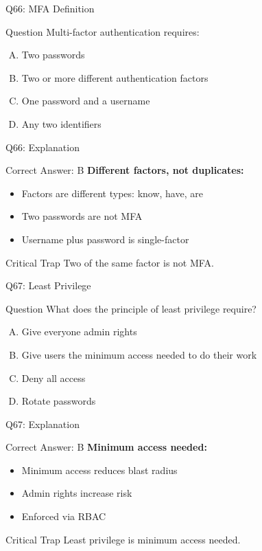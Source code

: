 \documentclass{beamer}
\begin{document}
	\begin{frame}{Q66: MFA Definition}
		\begin{block}{Question}
			Multi-factor authentication requires:
		\end{block}
		\begin{enumerate}[(A)]
			\item Two passwords
			\item Two or more different authentication factors
			\item One password and a username
			\item Any two identifiers
		\end{enumerate}
	\end{frame}
	
	\begin{frame}{Q66: Explanation}
		\begin{block}{Correct Answer: B}
			\textbf{Different factors, not duplicates:}
			\begin{itemize}
				\item Factors are different types: know, have, are
				\item Two passwords are not MFA
				\item Username plus password is single-factor
			\end{itemize}
		\end{block}
		\begin{alertblock}{Critical Trap}
			Two of the same factor is not MFA.
		\end{alertblock}
	\end{frame}
	
	\begin{frame}{Q67: Least Privilege}
		\begin{block}{Question}
			What does the principle of least privilege require?
		\end{block}
		\begin{enumerate}[(A)]
			\item Give everyone admin rights
			\item Give users the minimum access needed to do their work
			\item Deny all access
			\item Rotate passwords
		\end{enumerate}
	\end{frame}
	
	\begin{frame}{Q67: Explanation}
		\begin{block}{Correct Answer: B}
			\textbf{Minimum access needed:}
			\begin{itemize}
				\item Minimum access reduces blast radius
				\item Admin rights increase risk
				\item Enforced via RBAC
			\end{itemize}
		\end{block}
		\begin{alertblock}{Critical Trap}
			Least privilege is minimum access needed.
		\end{alertblock}
	\end{frame}
	
\end{document}
